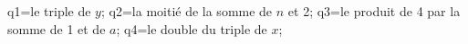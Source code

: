 \documentclass[exercice]{thedocument}%
\begin{document}
%
\>q1=le triple de $y$;%
\>q2=la moitié de la somme de $n$ et 2;%
\>q3=le produit de 4 par la somme de 1 et de $a$;%
\>q4=le double du triple de $x$;%
%
\end{document}
